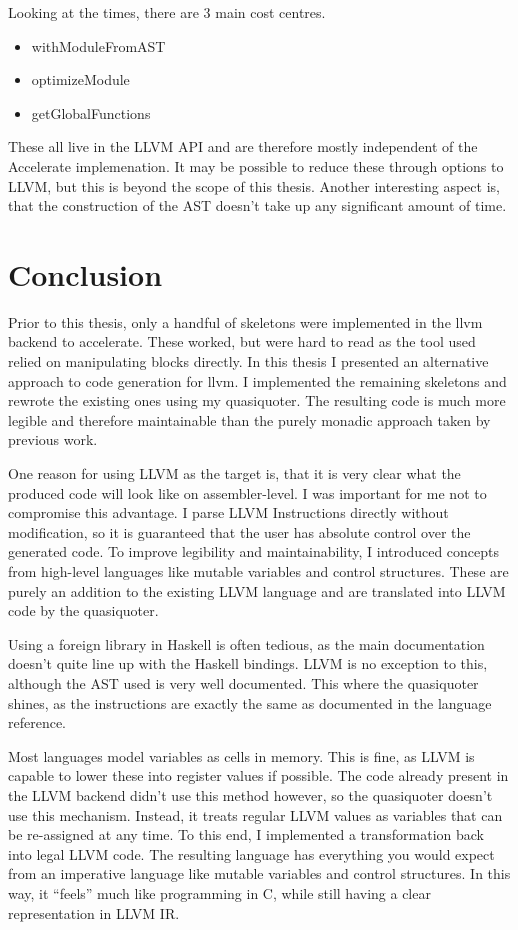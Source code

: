 \documentclass[a4paper,bibliography=totocnumbered,parskip,headsepline]{scrbook}
\begin{document}
Looking at the times, there are 3 main cost centres.

\begin{itemize}[noitemsep]
 \item withModuleFromAST
 \item optimizeModule
 \item getGlobalFunctions
\end{itemize}

These all live in the LLVM API and are therefore mostly independent of the Accelerate implemenation.
It may be possible to reduce these through options to LLVM, but this is beyond the scope of this thesis.
Another interesting aspect is, that the construction of the AST doesn't take up any significant amount of time.

\chapter{Conclusion}
Prior to this thesis, only a handful of skeletons were implemented in the llvm backend to accelerate.
These worked, but were hard to read as the tool used relied on manipulating blocks directly.
In this thesis I presented an alternative approach to code generation for llvm.
I implemented the remaining skeletons and rewrote the existing ones using my quasiquoter.
The resulting code is much more legible and therefore maintainable than the purely monadic approach taken by previous work.

One reason for using LLVM as the target is, that it is very clear what the produced code will look like on assembler-level.
I was important for me not to compromise this advantage.
I parse LLVM Instructions directly without modification, so it is guaranteed that the user has absolute control over the generated code.
To improve legibility and maintainability, I introduced concepts from high-level languages like mutable variables and control structures.
These are purely an addition to the existing LLVM language and are translated into LLVM code by the quasiquoter.

Using a foreign library in Haskell is often tedious, as the main documentation doesn't quite line up with the Haskell bindings.
LLVM is no exception to this, although the AST used is very well documented.
This where the quasiquoter shines, as the instructions are exactly the same as documented in the language reference.

Most languages model variables as cells in memory.
This is fine, as LLVM is capable to lower these into register values if possible.
The code already present in the LLVM backend didn't use this method however, so the quasiquoter doesn't use this mechanism.
Instead, it treats regular LLVM values as variables that can be re-assigned at any time.
To this end, I implemented a transformation back into legal LLVM code.
The resulting language has everything you would expect from an imperative language like mutable variables and control structures.
In this way, it ``feels'' much like programming in C, while still having a clear representation in LLVM IR.
\end{document}
